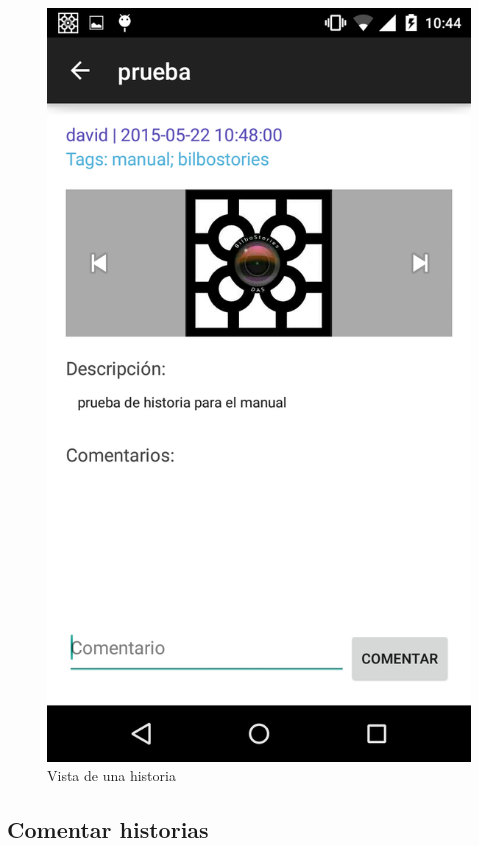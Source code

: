 \documentclass[11pt,a4paper, titlepage]{article}
\begin{document}
	\begin{figure}[hbtp]
		\centering
		\includegraphics[scale = 0.25 ]{img/15}
		\caption{Vista de una historia}
		\label{p22}
	\end{figure}
	
	\FloatBarrier
	\subsection{Comentar historias}
	
\end{document}
